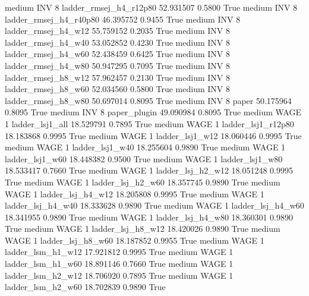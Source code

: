     medium      INV                 8 ladder_rmsej_h4_r12p80  52.931507      0.5800    True
    medium      INV                 8 ladder_rmsej_h4_r40p80  46.395752      0.9455    True
    medium      INV                 8    ladder_rmsej_h4_w12  55.759152      0.2035    True
    medium      INV                 8    ladder_rmsej_h4_w40  53.052852      0.4230    True
    medium      INV                 8    ladder_rmsej_h4_w60  52.438459      0.6425    True
    medium      INV                 8    ladder_rmsej_h4_w80  50.947295      0.7095    True
    medium      INV                 8    ladder_rmsej_h8_w12  57.962457      0.2130    True
    medium      INV                 8    ladder_rmsej_h8_w60  52.034560      0.5800    True
    medium      INV                 8    ladder_rmsej_h8_w80  50.697014      0.8095    True
    medium      INV                 8                  paper  50.175964      0.8095    True
    medium      INV                 8           paper_plugin  49.090984      0.8095    True
    medium     WAGE                 1        ladder_lsj1_all  18.529791      0.7895    True
    medium     WAGE                 1     ladder_lsj1_r12p80  18.183868      0.9995    True
    medium     WAGE                 1        ladder_lsj1_w12  18.060446      0.9995    True
    medium     WAGE                 1        ladder_lsj1_w40  18.255604      0.9890    True
    medium     WAGE                 1        ladder_lsj1_w60  18.448382      0.9500    True
    medium     WAGE                 1        ladder_lsj1_w80  18.533417      0.7660    True
    medium     WAGE                 1      ladder_lsj_h2_w12  18.051248      0.9995    True
    medium     WAGE                 1      ladder_lsj_h2_w60  18.357745      0.9890    True
    medium     WAGE                 1      ladder_lsj_h4_w12  18.205808      0.9995    True
    medium     WAGE                 1      ladder_lsj_h4_w40  18.333628      0.9890    True
    medium     WAGE                 1      ladder_lsj_h4_w60  18.341955      0.9890    True
    medium     WAGE                 1      ladder_lsj_h4_w80  18.360301      0.9890    True
    medium     WAGE                 1      ladder_lsj_h8_w12  18.420026      0.9890    True
    medium     WAGE                 1      ladder_lsj_h8_w60  18.187852      0.9955    True
    medium     WAGE                 1      ladder_lsm_h1_w12  17.921812      0.9995    True
    medium     WAGE                 1      ladder_lsm_h1_w60  18.891146      0.7660    True
    medium     WAGE                 1      ladder_lsm_h2_w12  18.706920      0.7895    True
    medium     WAGE                 1      ladder_lsm_h2_w60  18.702839      0.9890    True
